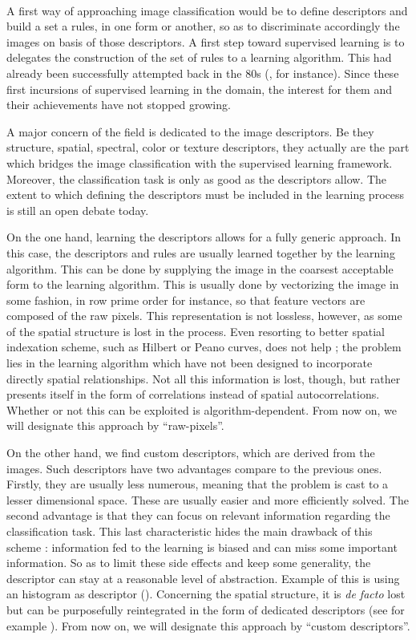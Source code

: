 \documentclass[a4paper]{report}
\begin{document}
\paragraph{}
A first way of approaching image classification would be to define descriptors and build a set a rules, in one form or another, so as to discriminate accordingly the images on basis of those descriptors. A first step toward supervised learning is to delegates the construction of the set of rules to a learning algorithm. This had already been successfully attempted back in the 80s (\cite{earlyDecisionTree}, for instance). Since these first incursions of supervised learning in the domain, the interest for them and their achievements have not stopped growing. 
\par
A major concern of the field is dedicated to the image descriptors. Be they structure, spatial, spectral, color or texture descriptors, they actually are the part which bridges the image classification with the supervised learning framework. Moreover, the classification task is only as good as the descriptors allow. The extent to which defining the descriptors must be included in the learning process is still an open debate today. 
\par
On the one hand, learning the descriptors allows for a fully generic approach. In this case, the descriptors and rules are usually learned together by the learning algorithm. This can be done by supplying the image in the coarsest acceptable form to the learning algorithm. This is usually done by vectorizing the image in some fashion, in row prime order for instance, so that feature vectors are composed of the raw pixels. This representation is not lossless, however, as some of the spatial structure is lost in the process. Even resorting to better spatial indexation scheme, such as Hilbert or Peano curves, does not help ; the problem lies in the learning algorithm which have not been designed to incorporate directly spatial relationships. Not all this information is lost, though, but rather presents itself in the form of correlations instead of spatial autocorrelations. Whether or not this can be exploited is algorithm-dependent. From now on, we will designate this approach by ``raw-pixels''.
\par
On the other hand, we find custom descriptors, which are derived from the images. Such descriptors have two advantages compare to the previous ones. Firstly, they are usually less numerous, meaning that the problem is cast to a lesser dimensional space. These are usually easier and more efficiently solved. The second advantage is that they can focus on relevant information regarding the classification task. This last characteristic hides the main drawback of this scheme : information fed to the learning is biased and can miss some important information. So as to limit these side effects and keep some generality, the descriptor can stay at a reasonable level of abstraction. Example of this is using an histogram as descriptor (\cite{histoIntersectSVM}). Concerning the spatial structure, it is \textit{de facto} lost but can be purposefully reintegrated in the form of dedicated descriptors (see for example \cite{geostat}). From now on, we will designate this approach by ``custom descriptors''.
\end{document}
